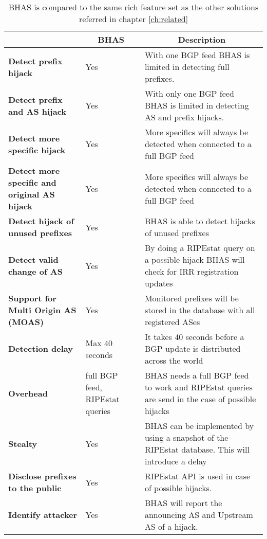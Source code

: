 \begin{table}[h]
\centering
\label{table:bhasfeatures}
\begin{tabular}{p{4cm}|p{3cm}|p{7cm}|}
\multicolumn{1}{l|}{} & \multicolumn{1}{c|}{\textbf{BHAS}} & \multicolumn{1}{c|}{\textbf{Description}} \\ \hline
\textbf{Detect prefix hijack\cite{hu2007accurate}} & Yes & With one BGP feed BHAS is limited in detecting full prefixes. \\ \hline
\textbf{Detect prefix and AS hijack\cite{hu2007accurate}} & Yes & With only one BGP feed BHAS is limited in detecting AS and prefix hijacks. \\ \hline
\textbf{Detect more specific hijack\cite{hu2007accurate, zheng2007light, shi2012detecting}} & Yes & More specifics will always be detected when connected to a full BGP feed \\ \hline
\textbf{Detect more specific and original AS hijack\cite{hu2007accurate, shi2012detecting}} & Yes & More specifics will always be detected when connected to a full BGP feed \\ \hline
\textbf{Detect hijack of unused prefixes \cite{vervier2015mind}} & Yes & BHAS is able to detect hijacks of unused prefixes \\ \hline
\textbf{Detect valid change of AS\cite{zhang2008ispy, shi2012detecting}} & Yes & By doing a RIPEstat query on a possible hijack BHAS will check for IRR registration updates  \\ \hline
\textbf{Support for Multi Origin AS (MOAS)\cite{zheng2007light}} & Yes & Monitored prefixes will be stored in the database with all registered ASes \\ \hline
\textbf{Detection delay\cite{shi2012detecting}} & Max 40 seconds & It takes 40 seconds before a BGP update is distributed across the world \\ \hline
\textbf{Overhead\cite{shi2012detecting}} & full BGP feed, RIPEstat queries & BHAS needs a full BGP feed to work and RIPEstat queries are send in the case of possible hijacks  \\ \hline
\textbf{Stealty\cite{hu2007accurate}} & Yes & BHAS can be implemented by using a snapshot of the RIPEstat database. This will introduce a delay \\ \hline
\textbf{Disclose prefixes to the public} & Yes & RIPEstat API is used in case of possible hijacks. \\ \hline
\textbf{Identify attacker\cite{shi2012detecting, zhang2008ispy}} & Yes & BHAS will report the announcing AS and Upstream AS of a hijack. \\ \hline
\end{tabular}
\caption{BHAS is compared to the same rich feature set as the other solutions referred in chapter \ref{ch:related}}
\end{table}

